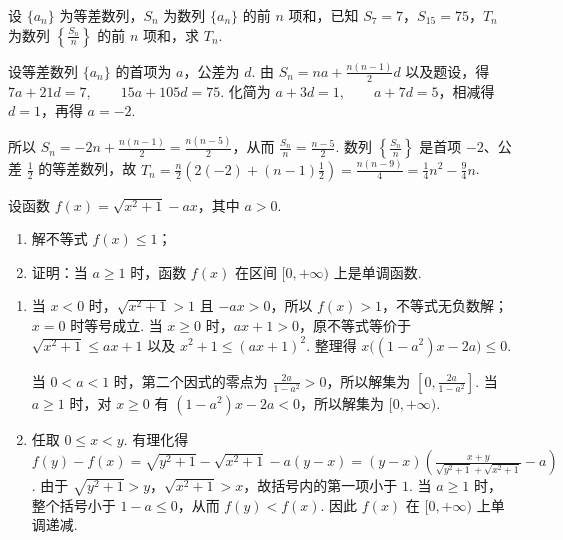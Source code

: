 \begin{problem}
设 \(\{a_{n}\}\) 为等差数列，\(S_{n}\) 为数列 \(\{a_{n}\}\) 的前 \(n\) 项和，已知 \(S_{7} = 7\)，\(S_{15} = 75\)，\(T_{n}\) 为数列 \(\left\{\frac{S_{n}}{n}\right\}\) 的前 \(n\) 项和，求 \(T_{n}\).
\end{problem}

\begin{solution}
设等差数列 \(\{a_n\}\) 的首项为 \(a\)，公差为 \(d\). 由
\(
S_n=na+\frac{n(n-1)}{2}d
\)
以及题设，得
\(
7a+21d=7,\qquad 15a+105d=75
\).
化简为
\(
a+3d=1,\qquad a+7d=5
\)，相减得 \(d=1\)，再得 \(a=-2\).

所以
\(
S_n=-2n+\frac{n(n-1)}{2}=\frac{n(n-5)}{2}
\)，从而
\(
\frac{S_n}{n}=\frac{n-5}{2}
\).
数列 \(\left\{\frac{S_n}{n}\right\}\) 是首项 \(-2\)、公差 \(\frac12\) 的等差数列，故
\(
T_n=\frac{n}{2}\left(2(-2)+(n-1)\frac12\right)
=\frac{n(n-9)}{4}
=\frac14n^{2}-\frac94n
\).
\end{solution}

\begin{problem}
设函数 \(f(x) = \sqrt{x^2 + 1} - ax\)，其中 \(a > 0\).

\begin{enumerate}
\item 解不等式 \(f(x) \leqslant 1\)；
\item 证明：当 \(a \geqslant 1\) 时，函数 \(f(x)\) 在区间 \([0, +\infty)\) 上是单调函数.
\end{enumerate}
\end{problem}

\begin{solution}
\begin{enumerate}
\item 当 \(x<0\) 时，\(\sqrt{x^{2}+1}>1\) 且 \(-ax>0\)，所以 \(f(x)>1\)，不等式无负数解；\(x=0\) 时等号成立. 当 \(x\geqslant0\) 时，\(ax+1>0\)，原不等式等价于
\(
\sqrt{x^{2}+1}\leqslant ax+1
\)
以及
\(
x^{2}+1\leqslant(ax+1)^{2}
\).
整理得
\(
x\bigl((1-a^{2})x-2a\bigr)\leqslant0
\).

当 \(0<a<1\) 时，第二个因式的零点为 \(\frac{2a}{1-a^{2}}>0\)，所以解集为
\(
\left[0,\frac{2a}{1-a^{2}}\right]
\).
当 \(a\geqslant1\) 时，对 \(x\geqslant0\) 有 \((1-a^{2})x-2a<0\)，所以解集为
\(
[0,+\infty)
\).

\item 任取 \(0\leqslant x<y\). 有理化得
\(f(y)-f(x)=\sqrt{y^{2}+1}-\sqrt{x^{2}+1}-a(y-x)=(y-x)\left(\frac{x+y}{\sqrt{y^{2}+1}+\sqrt{x^{2}+1}}-a\right)\).
由于 \(\sqrt{y^{2}+1}>y\)，\(\sqrt{x^{2}+1}>x\)，故括号内的第一项小于 \(1\). 当 \(a\geqslant1\) 时，整个括号小于 \(1-a\leqslant0\)，从而 \(f(y)<f(x)\). 因此 \(f(x)\) 在 \([0,+\infty)\) 上单调递减.
\end{enumerate}
\end{solution}

